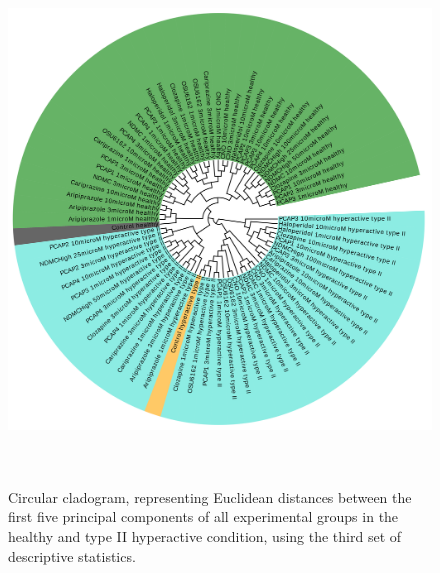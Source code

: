 \documentclass[a4paper,12pt]{article}
\begin{document}
\begin{figure}[h!]
\begin{center}
\includegraphics[width=14cm,height=14cm]{DarkPTZ_set3_PCA_tree_A.png}
\caption{Circular cladogram, representing Euclidean distances between the first five principal components of all experimental groups in the healthy and type II hyperactive condition, using the third set of descriptive statistics.}
\end{center}
\end{figure}
\newpage
\end{document}
